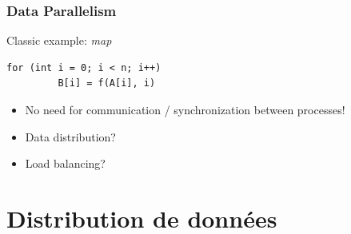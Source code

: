 \documentclass[xcolor={rgb,x11names,svgnames},rgb,x11names,svgnames]{beamer}
\begin{document}

\begin{frame}[fragile=singleslide]
  \frametitle{Data Parallelism}

  \begin{block}{Classic example: \emph{map}}
\begin{verbatim}
for (int i = 0; i < n; i++)
         B[i] = f(A[i], i)
\end{verbatim}
  \end{block}

  \bigskip

  \begin{itemize}
  \item No need for communication / synchronization between processes!
  \item Data distribution?
  \item Load balancing?
  \end{itemize}
\end{frame}


\section{Distribution de données}
\end{document}
